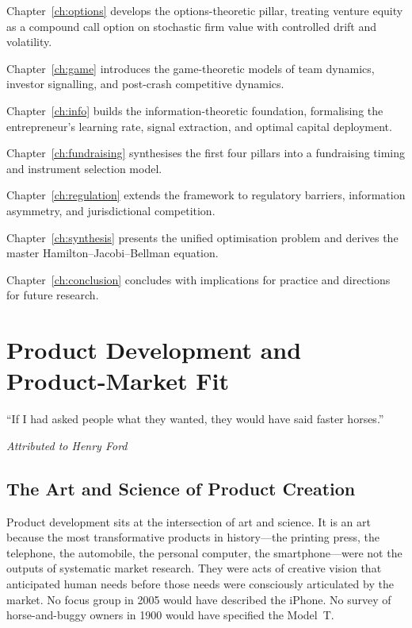 \documentclass[12pt,a4paper,oneside]{book}
\theoremstyle{definition}
\theoremstyle{remark}
\begin{document}
Chapter~\ref{ch:options} develops the options-theoretic pillar, treating venture equity as
a compound call option on stochastic firm value with controlled drift and volatility.

Chapter~\ref{ch:game} introduces the game-theoretic models of team dynamics, investor
signalling, and post-crash competitive dynamics.

Chapter~\ref{ch:info} builds the information-theoretic foundation, formalising the
entrepreneur's learning rate, signal extraction, and optimal capital deployment.

Chapter~\ref{ch:fundraising} synthesises the first four pillars into a fundraising timing
and instrument selection model.

Chapter~\ref{ch:regulation} extends the framework to regulatory barriers, information
asymmetry, and jurisdictional competition.

Chapter~\ref{ch:synthesis} presents the unified optimisation problem and derives the
master Hamilton--Jacobi--Bellman equation.

Chapter~\ref{ch:conclusion} concludes with implications for practice and directions for
future research.

\chapter{Product Development and Product-Market Fit}\label{ch:product}

\epigraph{``If I had asked people what they wanted, they would have said faster
horses.''}{\textit{Attributed to Henry Ford}}

\section{The Art and Science of Product Creation}\label{sec:art_science}

Product development sits at the intersection of art and science. It is an art because the
most transformative products in history---the printing press, the telephone, the
automobile, the personal computer, the smartphone---were not the outputs of systematic
market research. They were acts of creative vision that anticipated human needs before
those needs were consciously articulated by the market. No focus group in 2005 would have
described the iPhone. No survey of horse-and-buggy owners in 1900 would have specified
the Model~T.
\end{document}
